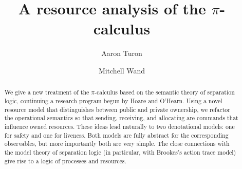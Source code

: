 \documentclass{entcs}
\begin{document}
\def\lastname{Turon and Wand}
\begin{frontmatter}
  \title{A resource analysis of the $\pi$-calculus} 
  \author{Aaron Turon}
  \author{Mitchell Wand}
  \address{College of Computer and Information Science\\
Northeastern University\\
Boston MA, USA}
\begin{abstract}
We give a new treatment of the $\pi$-calculus based on the semantic
theory of separation logic, continuing a research program begun by
Hoare and O'Hearn.  Using a novel resource model that distinguishes
between public and private ownership, we refactor the operational
semantics so that sending, receiving, and allocating are commands that
influence owned resources.  These ideas lead naturally to two
denotational models: one for safety and one for liveness.  Both models
are fully abstract for the corresponding observables, but more
importantly both are very simple.  The close connections with the
model theory of separation logic (in particular, with Brookes's action
trace model) give rise to a logic of processes and resources.  
\end{abstract}
\end{frontmatter}

\newcommand{\CA}{\mathcal{A}}
\newcommand{\CO}{\mathcal{O}}
\newcommand{\CB}{\mathcal{B}}
\newcommand{\CM}{\mathcal{M}}
\newcommand{\CE}{\mathcal{E}}
\newcommand{\CS}{\mathcal{S}}
\newcommand{\CD}{\mathcal{D}}
\newcommand{\CJ}{\mathcal{J}}
\newcommand{\CL}{\mathcal{L}}
\newcommand{\CC}{\mathcal{C}}
\newcommand{\CP}{\mathcal{P}}
\newcommand{\CR}{\mathcal{R}}
\newcommand{\CT}{\mathcal{T}}
\newcommand{\CU}{\mathcal{U}}
\newcommand{\CN}{\mathcal{N}}
\newcommand{\CI}{\mathcal{I}}

\newcommand{\Sem}[2]{\left\llbracket #1 \right\rrbracket^{#2}}
\newcommand{\SemB}[1]{\left\llbracket #1 \right\rrbracket}

\newcommand{\LSem}[2]{\mathcal{L}\!\left\llbracket #1 \right\rrbracket^{#2}}
\newcommand{\LSemB}[1]{\mathcal{L}\!\left\llbracket #1 \right\rrbracket}

\newcommand{\ASem}[2]{\llparenthesis #1 \rrparenthesis #2}
\newcommand{\ASemB}[1]{\llparenthesis #1 \rrparenthesis }

\newcommand{\Ob}[2]{\mathcal{O}\!\left\llbracket #1 \right\rrbracket \! #2}
\newcommand{\ObB}[1]{\mathcal{O}\!\left\llbracket #1 \right\rrbracket }

\newcommand{\LOb}[2]{\mathcal{LO}\!\left\llbracket #1 \right\rrbracket \! #2}
\newcommand{\LObB}[1]{\mathcal{LO}\!\left\llbracket #1 \right\rrbracket }
\end{document}
